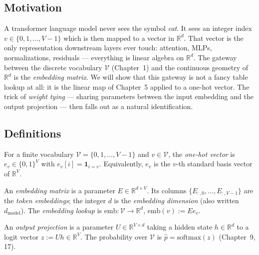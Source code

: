 \subsection*{Motivation}

A transformer language model never sees the symbol \emph{cat}. It sees an integer index $v\in\{0,1,\dots,V-1\}$ which is then mapped to a vector in $\mathbb{R}^d$. That vector is the only representation downstream layers ever touch: attention, MLPs, normalizations, residuals --- everything is linear algebra on $\mathbb{R}^d$. The gateway between the discrete vocabulary $\mathcal{V}$ (Chapter~1) and the continuous geometry of $\mathbb{R}^d$ is the \emph{embedding matrix}. We will show that this gateway is not a fancy table lookup at all: it is the linear map of Chapter~5 applied to a one-hot vector. The trick of \emph{weight tying} --- sharing parameters between the input embedding and the output projection --- then falls out as a natural identification.

\subsection*{Definitions}

\begin{definition}
For a finite vocabulary $\mathcal{V}=\{0,1,\dots,V-1\}$ and $v\in\mathcal{V}$, the \emph{one-hot vector} is $e_v\in\{0,1\}^V$ with $e_v[i]=\mathbf{1}_{i=v}$. Equivalently, $e_v$ is the $v$-th standard basis vector of $\mathbb{R}^V$.
\end{definition}

\begin{definition}
An \emph{embedding matrix} is a parameter $E\in\mathbb{R}^{d\times V}$. Its columns $\{E_{:,0},\dots,E_{:,V-1}\}$ are the \emph{token embeddings}; the integer $d$ is the \emph{embedding dimension} (also written $d_{\mathrm{model}}$). The \emph{embedding lookup} is $\mathrm{emb}\colon\mathcal{V}\to\mathbb{R}^d$, $\mathrm{emb}(v):=E e_v$.
\end{definition}

\begin{definition}
An \emph{output projection} is a parameter $U\in\mathbb{R}^{V\times d}$ taking a hidden state $h\in\mathbb{R}^d$ to a logit vector $z:=Uh\in\mathbb{R}^V$. The probability over $\mathcal{V}$ is $\hat p=\mathrm{softmax}(z)$ (Chapter~9, 17).
\end{definition}

